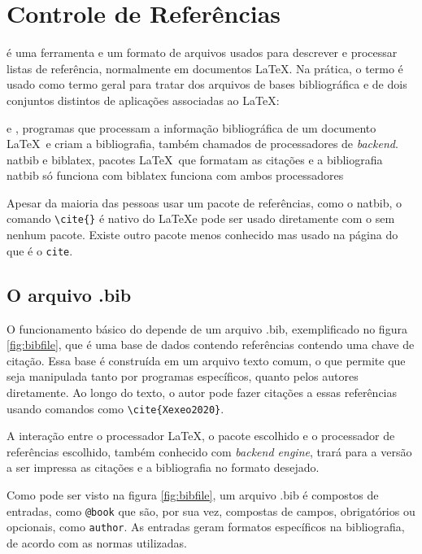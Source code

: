 \chapter{Controle de Referências}

 é uma ferramenta e um formato de arquivos usados para descrever e processar listas de referência,       normalmente em documentos \LaTeX  . Na prática, o termo  é usado como termo geral para tratar dos arquivos de bases bibliográfica e de dois conjuntos distintos de aplicações associadas ao \LaTeX:
\begin{outline}
    \1 \parencite{Patashnik:1988} e \parencite{Kime:2019a}, programas que
    processam a informação bibliográfica de um documento \LaTeX\ e criam a bibliografia, também chamados de processadores de \textit{backend}.
    \1 natbib\parencite{Daly:2010} e biblatex\parencite{Kime:2019}, pacotes \LaTeX\ que formatam as citações e a bibliografia
    \2 natbib só funciona com 
    \2 biblatex funciona com ambos processadores
\end{outline}

Apesar da maioria das pessoas usar um pacote de referências, como o natbib, o comando
\lstinline|\cite{}| é nativo do \LaTeX   e pode ser usado diretamente com o
 sem nenhum pacote. 
Existe outro pacote menos conhecido mas usado na página do  que é o \lstinline|cite|\parencite{Arseneau:2015}.

\section{O arquivo .bib}

O funcionamento básico do   depende de um arquivo .bib, exemplificado no figura \ref{fig:bibfile}, que é uma base de dados contendo  referências contendo uma chave de citação. Essa base é construída em um arquivo texto comum, o que permite que seja manipulada tanto por programas específicos, quanto pelos autores diretamente. Ao longo do texto, o autor pode fazer citações a essas referências usando comandos como \lstinline|\cite{Xexeo2020}|. 

A interação entre o processador \LaTeX, o pacote escolhido e o processador de referências escolhido, também conhecido com \textit{backend engine}, trará para a versão a ser impressa as citações e a bibliografia no formato desejado. 

Como pode ser visto na figura \ref{fig:bibfile}, um arquivo .bib é compostos de entradas, como \lstinline|@book| que são, por sua vez, compostas de campos, obrigatórios ou opcionais, como \lstinline|author|. As entradas geram formatos específicos na bibliografia, de acordo com as normas utilizadas.


